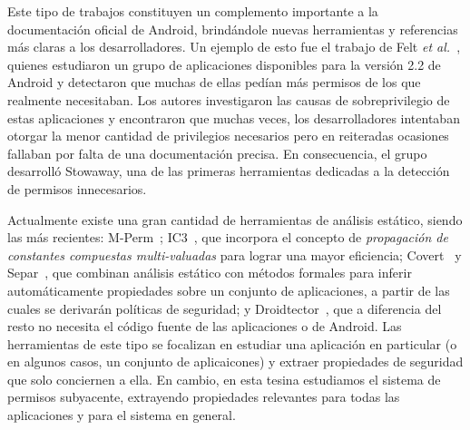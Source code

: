 Este tipo de trabajos constituyen un complemento importante a la documentación
oficial de Android, brindándole nuevas herramientas y referencias más claras a
los desarrolladores. Un ejemplo de esto fue el trabajo de Felt \textit{et
al.}~\cite{felt}, quienes estudiaron un grupo de aplicaciones disponibles para
la versión 2.2 de Android y detectaron que muchas de ellas pedían más permisos
de los que realmente necesitaban. Los autores investigaron las causas de
sobreprivilegio de estas aplicaciones y encontraron que muchas veces, los
desarrolladores intentaban otorgar la menor cantidad de privilegios necesarios
pero en reiteradas ocasiones fallaban por falta de una documentación precisa. En
consecuencia, el grupo desarrolló Stowaway, una de las primeras herramientas
dedicadas a la detección de permisos innecesarios.

%
Actualmente existe una gran cantidad de herramientas de análisis estático,
siendo las más recientes: M-Perm~\cite{mperm}; IC3~\cite{ic3}, que incorpora el
concepto de \textit{propagación de constantes compuestas multi-valuadas} para
lograr una mayor eficiencia; Covert~\cite{covert} y Separ~\cite{separ}, que
combinan análisis estático con métodos formales para inferir automáticamente
propiedades sobre un conjunto de aplicaciones, a partir de las cuales se
derivarán políticas de seguridad; y Droidtector~\cite{droidtector}, que a
diferencia del resto no necesita el código fuente de las aplicaciones o de
Android. Las herramientas de este tipo se focalizan en estudiar una aplicación en
particular (o en algunos casos, un conjunto de aplicaicones) y extraer
propiedades de seguridad que solo conciernen a ella. En cambio, en esta tesina
estudiamos el sistema de permisos subyacente, extrayendo propiedades relevantes
para todas las aplicaciones y para el sistema en general.


